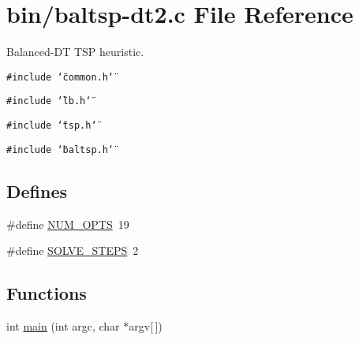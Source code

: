 \hypertarget{bin_2baltsp-dt2_8c}{
\section{bin/baltsp-dt2.c File Reference}
\label{bin_2baltsp-dt2_8c}
}
Balanced-DT TSP heuristic.  


{\tt \#include \char`\"{}common.h\char`\"{}}\par
{\tt \#include \char`\"{}lb.h\char`\"{}}\par
{\tt \#include \char`\"{}tsp.h\char`\"{}}\par
{\tt \#include \char`\"{}baltsp.h\char`\"{}}\par
\subsection*{Defines}
\begin{CompactItemize}
\item 
\#define \hyperlink{bin_2baltsp-dt2_8c_9b58b2c4af931c8486a986c9deca40f5}{NUM\_\-OPTS}~19
\item 
\#define \hyperlink{bin_2baltsp-dt2_8c_ceebcce8f411269df7b99e78247d7497}{SOLVE\_\-STEPS}~2
\end{CompactItemize}
\subsection*{Functions}
\begin{CompactItemize}
\item 
int \hyperlink{bin_2baltsp-dt2_8c_0ddf1224851353fc92bfbff6f499fa97}{main} (int argc, char $\ast$argv\mbox{[}$\,$\mbox{]})
\end{CompactItemize}
